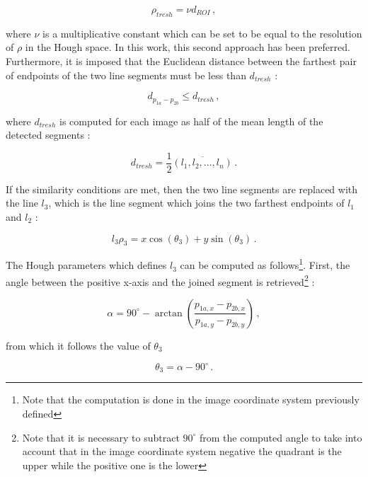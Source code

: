 \begin{equation}
  \rho_{tresh} = \nu d_{ROI} \,,
\end{equation}

where $\nu$ is a multiplicative constant which can be set to be equal to the resolution of $\rho$ in the Hough space. In this work, this second approach has been preferred.
Furthermore, it is imposed that the Euclidean distance between the farthest pair of endpoints of the two line segments must be less than $d_{tresh}$ :

\begin{equation}
  d_{p_{1a}-p_{2b}} \leqslant d_{tresh} \,,
\end{equation}

where $d_{tresh}$ is computed for each image as half of the mean length of the detected segments :

\begin{equation}
  d_{tresh} = {\frac{1}{2}} \overline{(l_1, l_2,\ldots, l_n)} \,.
\end{equation}

If the similarity conditions are met, then the two line segments are replaced with the line $l_3$, which is the line segment which joins the two farthest endpoints of $l_1$ and $l_2$ :

\begin{equation}
  l_3 \rho_3 = x \cos (\theta_3) +  y \sin (\theta_3) \,.
\end{equation}

The Hough parameters which defines $l_3$ can be computed as follows\footnote{Note that the computation is done in the image coordinate system previously defined}. First, the angle between the positive x-axis and the joined segment is retrieved\footnote{Note that it is necessary to subtract $90^{\circ}$ from the computed angle to take into account that in the image coordinate system negative the quadrant is the upper while the positive one is the lower} :

\begin{equation}
  \alpha = 90^{\circ} - \arctan{\left(\frac{p_{1a,x}-p_{2b,x}}{p_{1a,y}-p_{2b,y}}\right)} \,,
\end{equation}

from which it follows the value of $\theta_3$

\begin{equation}
  \theta_3 = \alpha - 90^{\circ} \,.
\end{equation}

